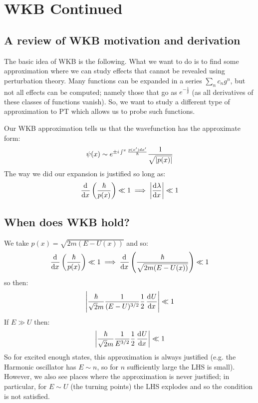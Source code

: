 \section{WKB Continued}
\subsection{A review of WKB motivation and derivation}
The basic idea of WKB is the following. What we want to do is to find some approximation where we can study effects that cannot be revealed using perturbation theory. Many functions can be expanded in a series $\sum_n c_n g^n$, but not all effects can be computed; namely those that go as $e^{-\frac{1}{g}}$ (as all derivatives of these classes of functions vanish). So, we want to study a different type of approximation to PT which allows us to probe such functions.

Our WKB approximation tells us that the wavefunction has the approximate form:
\begin{equation}
    \psi(x) \sim e^{\pm i \int^x \frac{p(x')dx'}{\hbar}} \frac{1}{\sqrt{\lvert p(x) \rvert}}
\end{equation}
The way we did our expansion is justified so long as:
\begin{equation}
    \dod{}{x}\left(\frac{\hbar}{p(x)}\right) \ll 1 \implies \left| \dod{\lambda}{x}\right| \ll 1
\end{equation}

\subsection{When does WKB hold?}
We take $p(x) = \sqrt{2m(E - U(x))}$ and so:
\begin{equation}
    \dod{}{x}\left(\frac{\hbar}{p(x)}\right) \ll 1 \implies \dod{}{x}\left(\frac{\hbar}{\sqrt{2m(E - U(x))}}\right) \ll 1
\end{equation}
so then:
\begin{equation}
    \left|\frac{\hbar}{\sqrt{2}m}\frac{1}{(E - U)^{3/2}}\frac{1}{2}\dod{U}{x}\right| \ll 1
\end{equation}
If $E \gg U$ then:
\begin{equation}
    \left|\frac{\hbar}{\sqrt{2}m}\frac{1}{E^{3/2}}\frac{1}{2}\dod{U}{x}\right| \ll 1
\end{equation}
So for excited enough states, this approximation is always justified (e.g. the Harmonic oscillator has $E \sim n$, so for $n$ sufficiently large the LHS is small). However, we also see places where the approximation is never justified; in particular, for $E \sim U$ (the turning points) the LHS explodes and so the condition is not satisfied.

